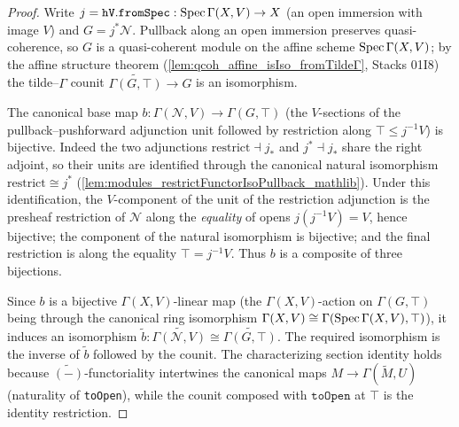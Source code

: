 \begin{proof}
  \leanok
  Write \(j = \mathtt{hV.fromSpec} : \operatorname{Spec}\Gamma(X,V) \to X\) (an open
  immersion with image \(V\)) and \(G = j^{*}\mathcal N\). Pullback along an
  open immersion preserves quasi-coherence, so \(G\) is a
  quasi-coherent module on the affine scheme \(\operatorname{Spec}\Gamma(X,V)\); by the
  affine structure theorem (\cref{lem:qcoh_affine_isIso_fromTildeΓ},
  Stacks 01I8) the tilde--\(\Gamma\)
  counit \(\widetilde{\Gamma(G,\top)} \to G\) is an isomorphism.

  The canonical base map \(b : \Gamma(\mathcal N, V) \to \Gamma(G, \top)\)
  (the \(V\)-sections of the pullback--pushforward adjunction unit followed by
  restriction along \(\top \le j^{-1}V\)) is bijective. Indeed the two
  adjunctions \(\mathrm{restrict} \dashv j_{*}\) and \(j^{*} \dashv j_{*}\)
  share the right adjoint, so their units are identified through the canonical
  natural isomorphism \(\mathrm{restrict} \cong j^{*}\)
  (\cref{lem:modules_restrictFunctorIsoPullback_mathlib}). Under this
  identification, the \(V\)-component of the unit of the restriction
  adjunction is the presheaf restriction of \(\mathcal N\) along the
  \emph{equality} of opens \(j(j^{-1}V) = V\), hence bijective; the component
  of the natural isomorphism is bijective; and the final restriction is along
  the equality \(\top = j^{-1}V\). Thus \(b\) is a composite of three
  bijections.

  Since \(b\) is a bijective \(\Gamma(X,V)\)-linear map (the
  \(\Gamma(X,V)\)-action on \(\Gamma(G,\top)\) being through the canonical
  ring isomorphism \(\Gamma(X,V) \cong \Gamma(\operatorname{Spec}\Gamma(X,V),\top)\)),
  it induces an isomorphism
  \(\widetilde{b} : \widetilde{\Gamma(\mathcal N,V)} \cong
  \widetilde{\Gamma(G,\top)}\). The required isomorphism is the inverse of
  \(\widetilde{b}\) followed by the counit. The characterizing section
  identity holds because \(\widetilde{(-)}\)-functoriality intertwines the
  canonical maps \(M \to \Gamma(\widetilde M, U)\) (naturality of
  \texttt{toOpen}), while the counit composed with \(\mathtt{toOpen}\) at
  \(\top\) is the identity restriction.
\end{proof}

